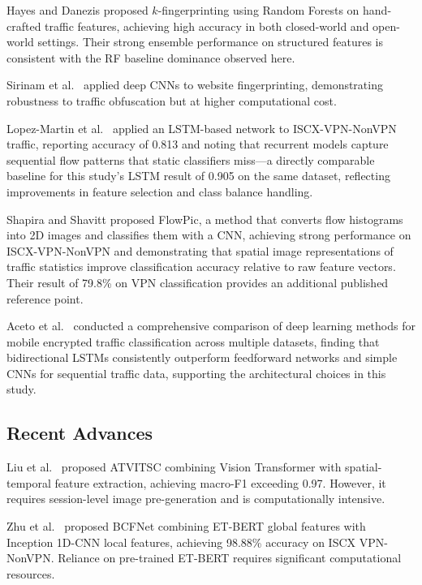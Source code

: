 \documentclass[conference]{IEEEtran}
\begin{document}
Hayes and Danezis \cite{hayes2016} proposed $k$-fingerprinting using Random
Forests on hand-crafted traffic features, achieving high accuracy in both
closed-world and open-world settings. Their strong ensemble performance on
structured features is consistent with the RF baseline dominance observed here.

Sirinam et al.\ \cite{sirinam2018} applied deep CNNs to website fingerprinting,
demonstrating robustness to traffic obfuscation but at higher computational cost.

Lopez-Martin et al.\ \cite{lopezmartin2017} applied an LSTM-based network to
ISCX-VPN-NonVPN traffic, reporting accuracy of 0.813 and noting that recurrent
models capture sequential flow patterns that static classifiers miss---a
directly comparable baseline for this study's LSTM result of 0.905 on the same
dataset, reflecting improvements in feature selection and class balance
handling.

Shapira and Shavitt \cite{shapira2021} proposed FlowPic, a method that
converts flow histograms into 2D images and classifies them with a CNN,
achieving strong performance on ISCX-VPN-NonVPN and demonstrating that spatial
image representations of traffic statistics improve classification accuracy
relative to raw feature vectors. Their result of 79.8\% on VPN classification
provides an additional published reference point.

Aceto et al.\ \cite{aceto2019} conducted a comprehensive comparison of deep
learning methods for mobile encrypted traffic classification across multiple
datasets, finding that bidirectional LSTMs consistently outperform feedforward
networks and simple CNNs for sequential traffic data, supporting the
architectural choices in this study.

\subsection{Recent Advances}

Liu et al.\ \cite{liu2024} proposed ATVITSC combining Vision Transformer with
spatial-temporal feature extraction, achieving macro-F1 exceeding 0.97. However,
it requires session-level image pre-generation and is computationally intensive.

Zhu et al.\ \cite{zhu2024} proposed BCFNet combining ET-BERT global features
with Inception 1D-CNN local features, achieving 98.88\% accuracy on ISCX
VPN-NonVPN. Reliance on pre-trained ET-BERT requires significant computational
resources.
\end{document}
